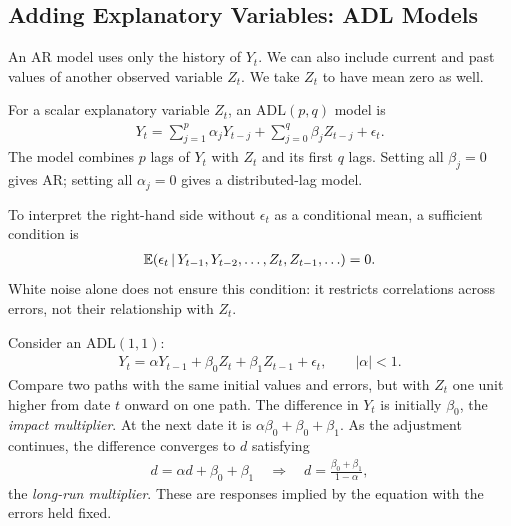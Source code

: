 \documentclass[a4paper,12pt]{article}
\begin{document}
\subsection{Adding Explanatory Variables: ADL Models}\label{sec-adl}

An AR model uses only the history of $Y_t$.
We can also include current and past values of another observed variable $Z_t$.
We take $Z_t$ to have mean zero as well.

\begin{definition}
	For a scalar explanatory variable $Z_t$, an $\mathrm{ADL}(p,q)$ model is
	\begin{align}\label{eq-adl}
		Y_t=\sum_{j=1}^p\alpha_jY_{t-j}
		+\sum_{j=0}^q\beta_jZ_{t-j}+\epsilon_t.
	\end{align}
	The model combines $p$ lags of $Y_t$ with $Z_t$ and its first $q$ lags.
	Setting all $\beta_j=0$ gives AR; setting all $\alpha_j=0$ gives a distributed-lag model.
\end{definition}

\begin{remark}
	To interpret the right-hand side without $\epsilon_t$ as a conditional mean, a sufficient condition is
	\begin{align}\label{eq-adl-mean}
		\operatorname{\mathbb{E}}(\epsilon_t\mathpunct{}|\mathpunct{} Y_{t-1},Y_{t-2},\ldots,Z_t,Z_{t-1},\ldots)=0.
	\end{align}
	White noise alone does not ensure this condition: it restricts correlations across errors,
	not their relationship with $Z_t$.
\end{remark}

\begin{example}
	Consider an $\mathrm{ADL}(1,1)$:
	\begin{align}
		Y_t=\alpha Y_{t-1}+\beta_0Z_t+\beta_1Z_{t-1}+\epsilon_t,
		\qquad |\alpha|<1.
	\end{align}
	Compare two paths with the same initial values and errors, but with $Z_t$ one unit higher
	from date $t$ onward on one path.
	The difference in $Y_t$ is initially $\beta_0$, the \emph{impact multiplier}.
	At the next date it is $\alpha\beta_0+\beta_0+\beta_1$.
	As the adjustment continues, the difference converges to $d$ satisfying
	\begin{align}
		d=\alpha d+\beta_0+\beta_1
		\quad\Longrightarrow\quad d=\frac{\beta_0+\beta_1}{1-\alpha},
	\end{align}
	the \emph{long-run multiplier}.
	These are responses implied by the equation with the errors held fixed.
\end{example}
\end{document}
